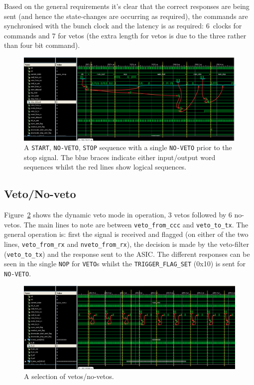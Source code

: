 Based on the general requirements it's clear that the correct responses are being sent (and hence the state-changes are occurring as required), the commands are synchronised with the bunch clock and the latency is as required: 6~clocks for commands and 7 for vetos (the extra length for vetos is due to the three rather than four bit command).

\begin{figure}
    \centering
    \includegraphics[width=\textwidth]{images/isim/edited/start-veto-stop.png}
    \caption{A \texttt{START}, \texttt{NO-VETO}, \texttt{STOP} sequence with a single \texttt{NO-VETO} prior to the stop signal. The blue braces indicate either input/output word sequences whilst the red lines show logical sequences.}
    \label{fig:isim_start-veto-stop}
\end{figure}

\clearpage
\subsection{Veto/No-veto} %
\label{sec:veto_no_veto}
Figure~\ref{fig:isim_veto_no_veto} shows the dynamic veto mode in operation, 3 vetos followed by 6 no-vetos. The main lines to note are between \texttt{veto\_from\_ccc} and \texttt{veto\_to\_tx}. The general operation is: first the signal is received and flagged (on either of the two lines, \texttt{veto\_from\_rx} and \texttt{nveto\_from\_rx}), the decision is made by the veto-filter (\texttt{veto\_to\_tx}) and the response sent to the ASIC. The different responses can be seen in the single \texttt{NOP} for \texttt{VETO}s whilst the \texttt{TRIGGER\_FLAG\_SET} (0x10) is sent for \texttt{NO-VETO}. 

\begin{figure}
  \centering
  \includegraphics[width=\textwidth]{images/isim/edited/veto_no_veto.png}
  \caption{A selection of vetos/no-vetos.}
  \label{fig:isim_veto_no_veto}
\end{figure}
\clearpage
